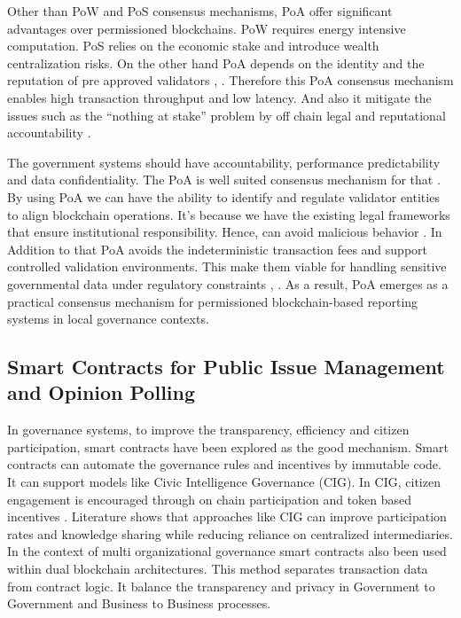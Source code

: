 Other than \ac{PoW} and \ac{PoS} consensus mechanisms, \ac{PoA} offer significant advantages over permissioned blockchains. \ac{PoW} requires energy intensive computation. \ac{PoS} relies on the economic stake and introduce wealth centralization risks. On the other hand \ac{PoA} depends on the identity and the reputation of pre approved validators \cite{researchgate2020survey}, \cite{zebpay2026poa}. Therefore this \ac{PoA} consensus mechanism enables high transaction throughput and low latency. And also it mitigate the issues such as the ``nothing at stake'' problem by off chain legal and reputational accountability \cite{echo2026poa}.

The government systems should have accountability, performance predictability and data confidentiality. The \ac{PoA} is well suited consensus mechanism for that \cite{onekey2026poa}. By using \ac{PoA} we can have the ability to identify and regulate validator entities to align blockchain operations. It's because we have the existing legal frameworks that ensure institutional responsibility. Hence, can avoid malicious behavior \cite{hep2023governance}. In Addition to that PoA avoids the indeterministic transaction fees and support controlled validation environments. This make them viable for handling sensitive governmental data under regulatory constraints \cite{zebpay2026poa}, \cite{mdpi2023unleashing}. As a result, \ac{PoA} emerges as a practical consensus mechanism for permissioned blockchain-based reporting systems in local governance contexts.

\subsection{Smart Contracts for Public Issue Management and Opinion Polling}

In governance systems, to improve the transparency, efficiency and citizen participation, smart contracts have been explored as the good mechanism. Smart contracts can automate the governance rules and incentives by immutable code. It can support models like Civic Intelligence Governance (CIG). In CIG, citizen engagement is encouraged through on chain participation and token based incentives \cite{MDPI_2023_CivicIntelligence}. Literature shows that approaches like CIG can improve participation rates and knowledge sharing while reducing reliance on centralized intermediaries. In the context of multi organizational governance smart contracts also been used within dual blockchain architectures. This method separates transaction data from contract logic. It balance the transparency and privacy in Government to Government and Business to Business processes\cite{IEEE_2021_SmartCon}.

